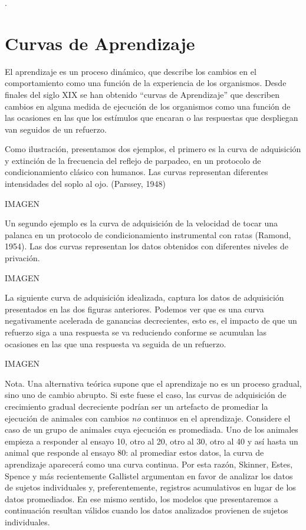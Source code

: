 \documentclass[
  letterpaper,
]{book}
\begin{document}
.

\section{Curvas de Aprendizaje}\label{curvas-de-aprendizaje}

El aprendizaje es un proceso dinámico, que describe los cambios en el
comportamiento como una función de la experiencia de los organismos.
Desde finales del siglo XIX se han obtenido ``curvas de Aprendizaje''
que describen cambios en alguna medida de ejecución de los organismos
como una función de las ocasiones en las que los estímulos que encaran o
las respuestas que despliegan van seguidos de un refuerzo.

Como ilustración, presentamos dos ejemplos, el primero es la curva de
adquisición y extinción de la frecuencia del reflejo de parpadeo, en un
protocolo de condicionamiento clásico con humanos. Las curvas
representan diferentes intensidades del soplo al ojo. (Parssey, 1948)

IMAGEN

Un segundo ejemplo es la curva de adquisición de la velocidad de tocar
una palanca en un protocolo de condicionamiento instrumental con ratas
(Ramond, 1954). Las dos curvas representan los datos obtenidos con
diferentes niveles de privación.

IMAGEN

La siguiente curva de adquisición idealizada, captura los datos de
adquisición presentados en las dos figuras anteriores. Podemos ver que
es una curva negativamente acelerada de ganancias decrecientes, esto es,
el impacto de que un refuerzo siga a una respuesta se va reduciendo
conforme se acumulan las ocasiones en las que una respuesta va seguida
de un refuerzo.

IMAGEN

Nota. Una alternativa teórica supone que el aprendizaje no es un proceso
gradual, sino uno de cambio abrupto. Si este fuese el caso, las curvas
de adquisición de crecimiento gradual decreciente podrían ser un
artefacto de promediar la ejecución de animales con cambios \emph{no}
continuos en el aprendizaje. Considere el caso de un grupo de animales
cuya ejecución es promediada. Uno de los animales empieza a responder al
ensayo 10, otro al 20, otro al 30, otro al 40 y así hasta un animal que
responde al ensayo 80: al promediar estos datos, la curva de aprendizaje
aparecerá como una curva continua. Por esta razón, Skinner, Estes,
Spence y más recientemente Gallistel argumentan en favor de analizar los
datos de sujetos individuales y, preferentemente, registros acumulativos
en lugar de los datos promediados. En ese mismo sentido, los modelos que
presentaremos a continuación resultan válidos cuando los datos
analizados provienen de sujetos individuales.
\end{document}
